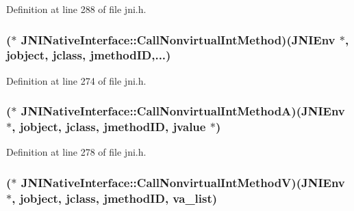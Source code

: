 Definition at line 288 of file jni.\-h.

\hypertarget{struct_j_n_i_native_interface_a3773f502b4d38974e1a49b25e9208fc2}{
\subsubsection[{Call\-Nonvirtual\-Int\-Method}]{($\ast$ J\-N\-I\-Native\-Interface\-::\-Call\-Nonvirtual\-Int\-Method)({\bf J\-N\-I\-Env} $\ast$, {\bf jobject}, {\bf jclass}, {\bf jmethod\-I\-D},...)}}\label{struct_j_n_i_native_interface_a3773f502b4d38974e1a49b25e9208fc2}


Definition at line 274 of file jni.\-h.

\hypertarget{struct_j_n_i_native_interface_ab6526a39ba3afbbd73d571e517fbb0f6}{
\subsubsection[{Call\-Nonvirtual\-Int\-Method\-A}]{($\ast$ J\-N\-I\-Native\-Interface\-::\-Call\-Nonvirtual\-Int\-Method\-A)({\bf J\-N\-I\-Env} $\ast$, {\bf jobject}, {\bf jclass}, {\bf jmethod\-I\-D}, {\bf jvalue} $\ast$)}}\label{struct_j_n_i_native_interface_ab6526a39ba3afbbd73d571e517fbb0f6}


Definition at line 278 of file jni.\-h.

\hypertarget{struct_j_n_i_native_interface_aa7ad5ada1deeaec9dc6957e72aeaeca4}{
\subsubsection[{Call\-Nonvirtual\-Int\-Method\-V}]{($\ast$ J\-N\-I\-Native\-Interface\-::\-Call\-Nonvirtual\-Int\-Method\-V)({\bf J\-N\-I\-Env} $\ast$, {\bf jobject}, {\bf jclass}, {\bf jmethod\-I\-D}, va\-\_\-list)}}\label{struct_j_n_i_native_interface_aa7ad5ada1deeaec9dc6957e72aeaeca4}



